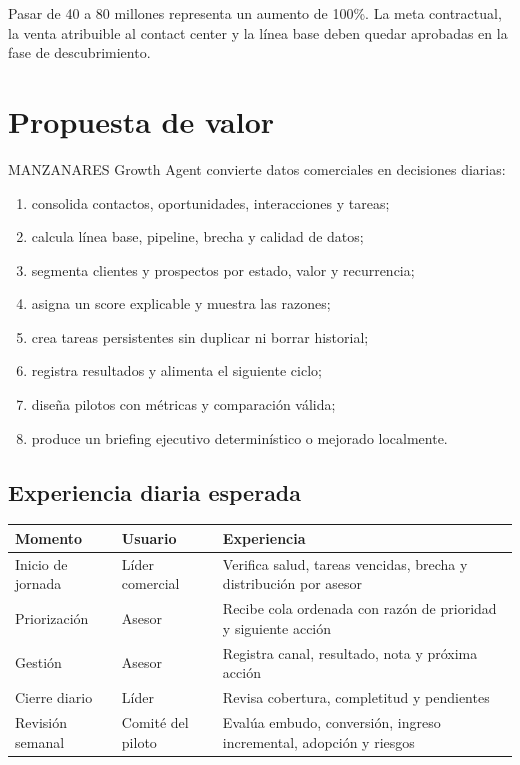 \documentclass[11pt,a4paper]{article}
\begin{document}
Pasar de 40 a 80 millones representa un aumento de 100\%. La meta contractual,
la venta atribuible al contact center y la línea base deben quedar aprobadas en
la fase de descubrimiento.

\section{Propuesta de valor}

MANZANARES Growth Agent convierte datos comerciales en decisiones diarias:

\begin{enumerate}
  \item consolida contactos, oportunidades, interacciones y tareas;
  \item calcula línea base, pipeline, brecha y calidad de datos;
  \item segmenta clientes y prospectos por estado, valor y recurrencia;
  \item asigna un score explicable y muestra las razones;
  \item crea tareas persistentes sin duplicar ni borrar historial;
  \item registra resultados y alimenta el siguiente ciclo;
  \item diseña pilotos con métricas y comparación válida;
  \item produce un briefing ejecutivo determinístico o mejorado localmente.
\end{enumerate}

\subsection{Experiencia diaria esperada}

\begin{longtable}{p{3cm}p{5.2cm}p{6.4cm}}
\toprule
\textbf{Momento} & \textbf{Usuario} & \textbf{Experiencia}\\
\midrule
\endhead
Inicio de jornada & Líder comercial & Verifica salud, tareas vencidas, brecha y
distribución por asesor\\
Priorización & Asesor & Recibe cola ordenada con razón de prioridad y siguiente
acción\\
Gestión & Asesor & Registra canal, resultado, nota y próxima acción\\
Cierre diario & Líder & Revisa cobertura, completitud y pendientes\\
Revisión semanal & Comité del piloto & Evalúa embudo, conversión, ingreso
incremental, adopción y riesgos\\
\bottomrule
\end{longtable}
\end{document}
